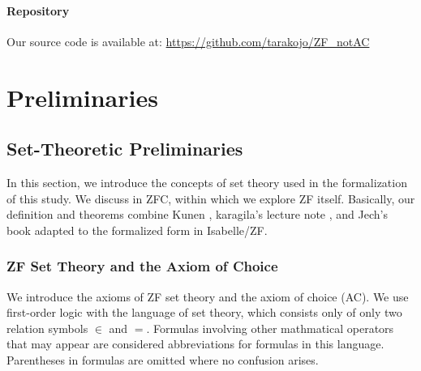 \documentclass{report}
\begin{document}
\subsubsection{Repository}
Our source code is available at: \url{https://github.com/tarakojo/ZF_notAC}




\chapter{Preliminaries}\label{chap:preliminaries}



\section{Set-Theoretic Preliminaries}
In this section, we introduce the concepts of set theory used in the formalization of this study.
We discuss in ZFC, within which we explore ZF itself. 
Basically, our definition and theorems combine Kunen \cite{kunen2011}, karagila's lecture note \cite{karagila}, and Jech's book \cite{jech_AC}
adapted to the formalized form in Isabelle/ZF.


\subsection{ZF Set Theory and the Axiom of Choice}
We introduce the axioms of ZF set theory and the axiom of choice (AC).
We use first-order logic with the language of set theory, which consists only of only two relation symbols $\in$ and $=$. 
Formulas involving other mathmatical operators that may appear are considered abbreviations for formulas in this language.
Parentheses in formulas are omitted where no confusion arises.
\end{document}
